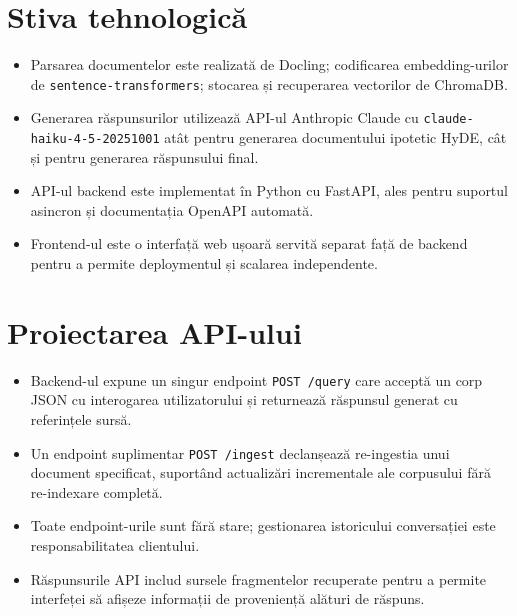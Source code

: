\documentclass[12pt,a4paper]{report}
\begin{document}
\section{Stiva tehnologică}
\begin{itemize}
    \item Parsarea documentelor este realizată de Docling; codificarea embedding-urilor de \texttt{sentence-transformers}; stocarea și recuperarea vectorilor de ChromaDB.
    \item Generarea răspunsurilor utilizează API-ul Anthropic Claude cu \texttt{claude-haiku-4-5-20251001} atât pentru generarea documentului ipotetic HyDE, cât și pentru generarea răspunsului final.
    \item API-ul backend este implementat în Python cu FastAPI, ales pentru suportul asincron și documentația OpenAPI automată.
    \item Frontend-ul este o interfață web ușoară servită separat față de backend pentru a permite deploymentul și scalarea independente.
\end{itemize}

\section{Proiectarea API-ului}
\begin{itemize}
    \item Backend-ul expune un singur endpoint \texttt{POST /query} care acceptă un corp JSON cu interogarea utilizatorului și returnează răspunsul generat cu referințele sursă.
    \item Un endpoint suplimentar \texttt{POST /ingest} declanșează re-ingestia unui document specificat, suportând actualizări incrementale ale corpusului fără re-indexare completă.
    \item Toate endpoint-urile sunt fără stare; gestionarea istoricului conversației este responsabilitatea clientului.
    \item Răspunsurile API includ sursele fragmentelor recuperate pentru a permite interfeței să afișeze informații de proveniență alături de răspuns.
\end{itemize}
\end{document}
